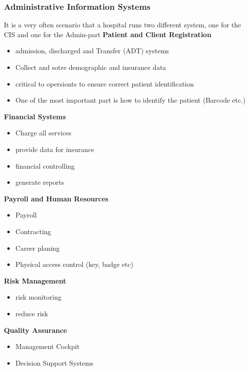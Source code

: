 \documentclass{report}
\theoremstyle{definition}
\theoremstyle{example}
\begin{document}
\subsubsection{Administrative Information Systems}
It is a very often scenario that a hospital runs two different system, one for the CIS and one for the Admin-part
\textbf{Patient and Client Registration}\\
\begin{itemize}
   \item admission, discharged and Transfer (ADT) systems
   \item Collect and sotre demographic and insurance data
   \item critical to opersionts to ensure correct patient identification
   \item One of the most important part is how to identify the patient (Barcode etc.)
\end{itemize}

\textbf{Financial Systems}\\
\begin{itemize}
   \item Charge all services
   \item provide data for insurance
   \item financial controlling
   \item generate reports
\end{itemize}

\textbf{Payroll and Human Resources}\\
\begin{itemize}
   \item Payroll
   \item Contracting
   \item Career planing
   \item Physical access control (key, badge etc)
\end{itemize}

\textbf{Risk Management}\\
\begin{itemize}
   \item risk monitoring
   \item reduce risk
\end{itemize}

\textbf{Quality Assurance}\\
\begin{itemize}
   \item Management Cockpit
   \item Decision Support Systems
\end{itemize}
\end{document}
